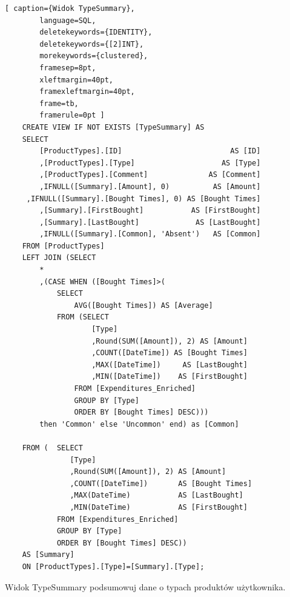 \documentclass[a4paper,10pt, twoside]{report}
\begin{document}
\begin{minipage}{\textwidth}
    \begin{lstlisting}[ caption={Widok TypeSummary},
        language=SQL,
        deletekeywords={IDENTITY},
        deletekeywords={[2]INT},
        morekeywords={clustered},
        framesep=8pt,
        xleftmargin=40pt,
        framexleftmargin=40pt,
        frame=tb,
        framerule=0pt ]
    CREATE VIEW IF NOT EXISTS [TypeSummary] AS
    SELECT
        [ProductTypes].[ID]                         AS [ID]
        ,[ProductTypes].[Type]                    AS [Type]
        ,[ProductTypes].[Comment]              AS [Comment]
        ,IFNULL([Summary].[Amount], 0)          AS [Amount]
     ,IFNULL([Summary].[Bought Times], 0) AS [Bought Times]
        ,[Summary].[FirstBought]           AS [FirstBought]
        ,[Summary].[LastBought]             AS [LastBought]
        ,IFNULL([Summary].[Common], 'Absent')   AS [Common]
    FROM [ProductTypes]
    LEFT JOIN (SELECT 
        *
        ,(CASE WHEN ([Bought Times]>(
            SELECT 
                AVG([Bought Times]) AS [Average] 
            FROM (SELECT
                    [Type]
                    ,Round(SUM([Amount]), 2) AS [Amount]
                    ,COUNT([DateTime]) AS [Bought Times]
                    ,MAX([DateTime])     AS [LastBought]
                    ,MIN([DateTime])    AS [FirstBought]
                FROM [Expenditures_Enriched]
                GROUP BY [Type]
                ORDER BY [Bought Times] DESC))) 
        then 'Common' else 'Uncommon' end) as [Common]
        
    FROM (	SELECT
               [Type]
               ,Round(SUM([Amount]), 2) AS [Amount]
               ,COUNT([DateTime])       AS [Bought Times]
               ,MAX(DateTime)           AS [LastBought]
               ,MIN(DateTime)           AS [FirstBought]
            FROM [Expenditures_Enriched]
            GROUP BY [Type]
            ORDER BY [Bought Times] DESC))
    AS [Summary]
    ON [ProductTypes].[Type]=[Summary].[Type];
    \end{lstlisting}
    {Widok TypeSummary podsumowuj dane o typach produktów użytkownika.}
    \end{minipage}
    
\end{document}
